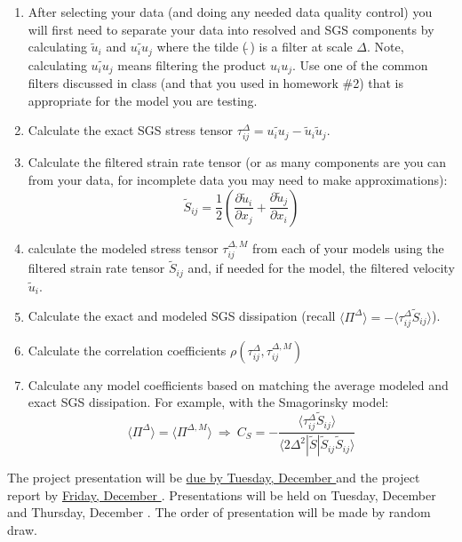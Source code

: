 \documentclass[11pt]{article}
\begin{document}
\begin{enumerate}

\item After selecting your data (and doing any needed data quality control) you will first need to separate
your data into resolved and SGS components by calculating $\tilde{u}_i$ and $\widetilde{u_iu_j}$ where
the tilde ($\tilde{~}$) is a filter at scale $\Delta$.  Note, calculating $\widetilde{u_iu_j}$ means
filtering the product $u_iu_j$.  Use one of the common filters discussed in class (and that you used in homework \#2)
that is appropriate for the model you are testing.  

\item Calculate the exact SGS stress tensor $\tau_{ij}^{\Delta}=\widetilde{u_iu_j}-\tilde{u}_i\tilde{u}_j$.

\item Calculate the filtered strain rate tensor (or as many components are you can from your data, for incomplete
data you may need to make approximations):
\begin{equation}
\tilde{S}_{ij} = \frac{1}{2}\left( \frac{\partial \tilde{u}_i}{\partial x_j} + 
\frac{\partial \tilde{u}_j}{\partial x_i}\right) \nonumber
\end{equation}

\item calculate the modeled stress tensor $\tau_{ij}^{\Delta,M}$ from each of your models using the filtered
strain rate tensor $\tilde{S}_{ij}$ and, if needed for the model, the filtered velocity $\tilde{u}_i$.

\item Calculate the exact and modeled SGS dissipation (recall $\langle \Pi^{\Delta} \rangle = 
-\langle \tau_{ij}^{\Delta}\tilde{S}_{ij} \rangle$).

\item Calculate the correlation coefficients $\rho\left( \tau_{ij}^{\Delta},\tau_{ij}^{\Delta,M} \right)$

\item Calculate any model coefficients based on matching the average modeled and exact SGS dissipation.
For example, with the Smagorinsky model:
\begin{equation}
\langle \Pi^{\Delta} \rangle=\langle \Pi^{\Delta,M} \rangle \ \Rightarrow \ 
C_S = -\frac{\langle \tau_{ij}^{\Delta}\tilde{S}_{ij} \rangle}
{\langle 2\Delta^2|\tilde{S}|\tilde{S}_{ij}\tilde{S}_{ij}\rangle} \nonumber
\end{equation}

\end{enumerate}

The project presentation will be \underline{ due by Tuesday, December } and the project report by \underline{Friday, December }. Presentations will be held on Tuesday, December  and Thursday, December . The order of presentation will be made by random draw.

\nocite{*}
\footnotesize
\singlespacing

\end{document}
